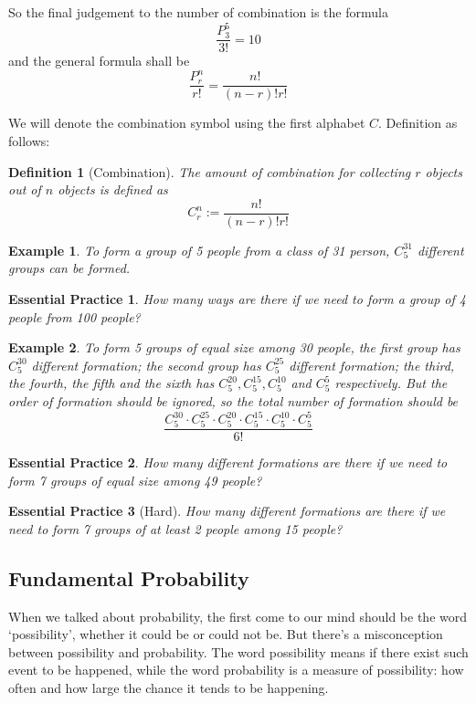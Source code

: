 \documentclass[12pt]{article}
\newtheorem{definition}{Definition}[section]
\newtheorem*{example}{Example}
\newtheorem{exercise}{Essential Practice}[subsection]
\begin{document}
    So the final judgement to the number of combination is the formula $$\frac{P_3^5}{3!}=10$$ and the general formula shall be $$\frac{P_r^n}{r!}=\frac{n!}{(n-r)!r!}$$

    We will denote the combination symbol using the first alphabet $C$. Definition as follows:

    \begin{definition}[Combination]
        The amount of combination for collecting $r$ objects out of $n$ objects is defined as $$C_r^n:=\frac{n!}{(n-r)!r!}$$
    \end{definition}

    \begin{example}
        To form a group of 5 people from a class of 31 person, $C_5^{31}$ different groups can be formed.
    \end{example}

    \begin{exercise}
        How many ways are there if we need to form a group of 4 people from 100 people?
    \end{exercise}

    \begin{example}
        To form 5 groups of equal size among 30 people, the first group has $C_5^{30}$ different formation; the second group has $C_5^{25}$ different formation; the third, the fourth, the fifth and the sixth has $C_5^{20}, C_5^{15}, C_5^{10}$ and $C_5^5$ respectively. But the order of formation should be ignored, so the total number of formation should be $$\frac{C_5^{30} \cdot C_5^{25} \cdot C_5^{20} \cdot C_5^{15} \cdot C_5^{10} \cdot C_5^5}{6!}$$
    \end{example}

    \begin{exercise}
        How many different formations are there if we need to form 7 groups of equal size among 49 people?
    \end{exercise}

    \begin{exercise}[Hard]
        How many different formations are there if we need to form 7 groups of at least 2 people among 15 people?
    \end{exercise}

    \subsection{Fundamental Probability}

    When we talked about probability, the first come to our mind should be the word `possibility', whether it could be or could not be. But there's a misconception between possibility and probability. The word possibility means if there exist such event to be happened, while the word probability is a measure of possibility: how often and how large the chance it tends to be happening.
\end{document}
